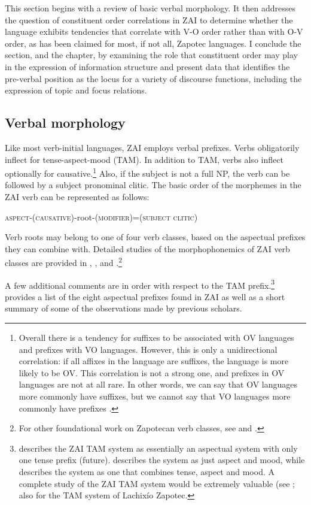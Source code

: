 This section begins with a review of basic verbal morphology. It then addresses the question of constituent order correlations in ZAI to determine whether the language exhibits tendencies that correlate with V-O order rather than with O-V order, as has been claimed for most, if not all, Zapotec languages. I conclude the section, and the chapter, by examining the role that constituent order may play in the expression of information structure and present data that identifies the pre-verbal position as the locus for a variety of discourse functions, including the expression of topic and focus relations. 



\subsection{Verbal morphology}\label{verbalmorphology}

Like most verb-initial languages, ZAI employs verbal prefixes. Verbs obligatorily inflect for tense-aspect-mood (TAM). In addition to TAM, verbs also inflect optionally for causative.\footnote{Overall there is a tendency for suffixes to be associated with OV languages and prefixes with VO languages. However, this is only a unidirectional correlation: if all affixes in the language are suffixes, the language is more likely to be OV. This correlation is not a strong one, and prefixes in OV languages are not at all rare. In other words, we can say that OV languages more commonly have suffixes, but we cannot say that VO languages more commonly have prefixes \citep{dryer2007}.} Also, if the subject is not a full NP, the verb can be followed by a subject pronominal clitic. The basic order of the morphemes in the ZAI verb can be represented as follows:


\vspace{3mm}
\textsc{aspect}-\textsc{(causative)}-root-\textsc{(modifier)}=\textsc{(subject clitic)}
\vspace{3mm}


Verb roots may belong to one of four verb classes, based on the aspectual prefixes they can combine with. Detailed studies of the morphophonemics of ZAI verb classes are provided in \citet{marlett1987}, \citet{enriquez2008}, and \citet{perez2015}.\footnote{For other foundational work on Zapotecan verb classes, see \citet{smithstark2002} and \citet{campbell2011}.}

A few additional comments are in order with respect to the TAM prefix.\footnote{\citet{pickett1998} describes the ZAI TAM system as essentially an aspectual system with only one tense prefix (future). \citet{mock1990} describes the system as just aspect and mood, while \citet{suarez1983} describes the system as one that combines tense, aspect and mood. A complete study of the ZAI TAM system would be extremely valuable (see \citet{perez2015}; also \citet{sicoli2015} for the TAM system of Lachix\'{i}o Zapotec.}  provides a list of the eight aspectual prefixes found in ZAI as well as a short summary of some of the observations made by previous scholars.  

